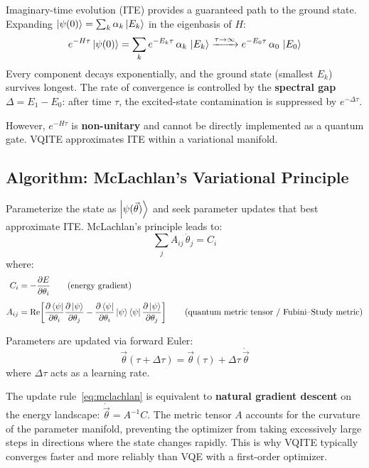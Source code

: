 \documentclass[11pt,a4paper]{article}
\begin{document}
Imaginary-time evolution (ITE) provides a guaranteed path to the ground
state.  Expanding $\ket{\psi(0)} = \sum_k \alpha_k \ket{E_k}$ in the
eigenbasis of $H$:
\begin{equation}
  e^{-H\tau}\ket{\psi(0)} = \sum_k e^{-E_k\tau}\,\alpha_k\,\ket{E_k}
  \xrightarrow{\tau\to\infty}
  e^{-E_0\tau}\,\alpha_0\,\ket{E_0}
  \label{eq:ite}
\end{equation}
Every component decays exponentially, and the ground state (smallest $E_k$)
survives longest.  The rate of convergence is controlled by the
\textbf{spectral gap} $\Delta = E_1 - E_0$: after time $\tau$, the
excited-state contamination is suppressed by $e^{-\Delta\tau}$.

However, $e^{-H\tau}$ is \textbf{non-unitary} and cannot be directly
implemented as a quantum gate.  VQITE approximates ITE within a
variational manifold.

\subsection{Algorithm: McLachlan's Variational Principle}

Parameterize the state as $\ket{\psi(\vec\theta)}$ and seek parameter
updates that best approximate ITE.  McLachlan's principle leads to:
\begin{equation}
  \boxed{\sum_j A_{ij}\,\dot\theta_j = C_i}
  \label{eq:mclachlan}
\end{equation}
where:
\begin{align}
  C_i &= -\frac{\partial E}{\partial \theta_i}
    \qquad\text{(energy gradient)}
    \label{eq:C_def} \\[4pt]
  A_{ij} &= \text{Re}\!\left[
    \frac{\partial\bra{\psi}}{\partial\theta_i}
    \frac{\partial\ket{\psi}}{\partial\theta_j}
    - \frac{\partial\bra{\psi}}{\partial\theta_i}\ket{\psi}
      \bra{\psi}\frac{\partial\ket{\psi}}{\partial\theta_j}
  \right]
    \qquad\text{(quantum metric tensor / Fubini--Study metric)}
    \label{eq:A_def}
\end{align}

Parameters are updated via forward Euler:
\begin{equation}
  \vec\theta(\tau + \Delta\tau) = \vec\theta(\tau) + \Delta\tau\,\dot{\vec\theta}
  \label{eq:euler}
\end{equation}
where $\Delta\tau$ acts as a learning rate.

\begin{keybox}
The update rule~\eqref{eq:mclachlan} is equivalent to \textbf{natural
gradient descent} on the energy landscape: $\dot{\vec\theta} = A^{-1}C$.
The metric tensor $A$ accounts for the curvature of the parameter
manifold, preventing the optimizer from taking excessively large steps
in directions where the state changes rapidly.  This is why VQITE
typically converges faster and more reliably than VQE with a
first-order optimizer.
\end{keybox}
\end{document}
